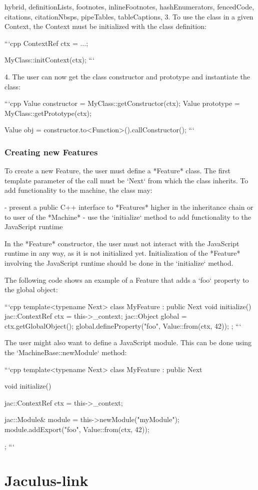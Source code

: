\documentclass[
  digital,
  oneside,
  nosansbold,
  nocolorbold,
  lof,
  lot
]{fithesis4}
\begin{document}
\begin{markdown*}{%
  hybrid,
  definitionLists,
  footnotes,
  inlineFootnotes,
  hashEnumerators,
  fencedCode,
  citations,
  citationNbsps,
  pipeTables,
  tableCaptions,
}
  3. To use the class in a given Context, the Context must be initialized with the class definition:

```cpp
ContextRef ctx = ...;

MyClass::initContext(ctx);
```

  4. The user can now get the class constructor and prototype and instantiate the class:

```cpp
Value constructor = MyClass::getConstructor(ctx);
Value prototype = MyClass::getPrototype(ctx);

Value obj = constructor.to<Function>().callConstructor();
```

\subsection{Creating new Features}

To create a new Feature, the user must define a *Feature* class. The first template parameter of the call must be `Next` from which the class inherits. To add functionality to the machine, the class may:

  - present a public C++ interface to *Features* higher in the inheritance chain or to user of the *Machine*
  - use the `initialize` method to add functionality to the JavaScript runtime

In the *Feature* constructor, the user must not interact with the JavaScript runtime in any way, as it is not initialized yet. Initialization of the *Feature* involving the JavaScript runtime should be done in the `initialize` method.

The following code shows an example of a Feature that adds a `foo` property to the global object:

```cpp
template<typename Next>
class MyFeature : public Next {
    void initialize() {
        jac::ContextRef ctx = this->_context;
        jac::Object global = ctx.getGlobalObject();
        global.defineProperty("foo", Value::from(ctx, 42));
    }
};
```

The user might also want to define a JavaScript module. This can be done using the `MachineBase::newModule` method:

```cpp
template<typename Next>
class MyFeature : public Next {
    void initialize() {
        jac::ContextRef ctx = this->_context;

        jac::Module& module = this->newModule("myModule");
        module.addExport("foo", Value::from(ctx, 42));
    }
};
```


\chapter{Jaculus-link}


\end{markdown*}
\end{document}
